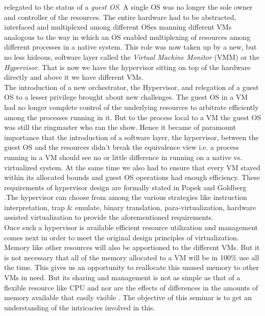 relegated to the status of a \textit{guest OS}. A single OS was no longer the sole owner and
controller of the resources. The entire hardware had to be abstracted, interfaced and multiplexed
among different OSes manning different VMs analogous to the way in which an OS enabled
multiplexing of resources among different processes in a native system. This role was now taken up
by a new, but no less hideous, software layer called the \textit{Virtual Machine Monitor} (VMM) or
the \textit{Hypervisor}. That is now we have the hypervisor sitting on top of the hardware 
directly and above it we have different VMs.\\
The introduction of a new orchestrator, the Hypervisor, and relegation of a guest OS to a lesser
privilege brought about new challenges. The guest OS in a VM had no longer complete control of the
underlying resources to arbitrate efficiently among the processes running in it. But to the
process local to a VM the guest OS was still the ringmaster who ran the show. Hence it became of
paramount importance that the introduction of a software layer, the hypervisor, between the guest
OS and the resources didn't break the equivalence view  i.e. a process running in a VM should see
no or little difference in running on a native vs. virtualized system. At the same time we also
had to ensure that every VM stayed within its allocated bounds and guest OS operations had enough
efficiency. These requirements of hypervisor design are formally stated in Popek and Goldberg
\citep{Popek1974}.The hypervisor can choose from among the various strategies like instruction
interpretation, trap \& emulate, binary translation, para-virtualization, hardware assisted
virtualization to provide the aforementioned requirements.\\
Once such a hypervisor is available efficient resource utilization and management comes next in
order to meet the original design principles of virtualization. Memory like other
resources will also be apportioned to the different VMs. But it is not necessary that all  of the
memory allocated to a VM will be in 100\% use all the time. This gives us an opportunity to
reallocate this unused memory to other VMs in need. But its sharing and management is not as
simple as that of a flexible resource like CPU and nor are the effects of differences in the
amounts of memory available that easily visible \citep{Mortar2014}. The objective of this seminar is to get an understanding of the intricacies involved in this. 

